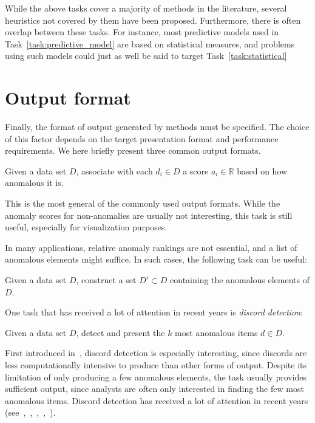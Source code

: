 While the above tasks cover a majority of methods in the literature, several heuristics not covered by them have been proposed. Furthermore, there is often overlap between these tasks. For instance, most predictive models used in Task~\ref{task:predictive_model} are based on statistical measures, and problems using such models could just as well be said to target Task~\ref{task:statistical}

\section{Output format}
\label{sect:output_format}

Finally, the format of output generated by methods must be specified. The choice of this factor depends on the target presentation format and performance requirements. We here briefly present three common output formats.

\begin{task}
\label{task:anomaly_scores}
  Given a data set $D$, associate with each $d_i \in D$ a score $a_i \in \mathbb{R}$ based on how anomalous it is.
\end{task}
This is the most general of the commonly used output formats. While the anomaly scores for non-anomalies are usually not interesting, this task is still useful, especially for visualization purposes.

In many applications, relative anomaly rankings are not essential, and a list of anomalous elements might suffice. In such cases, the following task can be useful:
\begin{task}
\label{task:anomalous_set}
  Given a data set $D$, construct a set $D' \subset D$ containing the anomalous elements of $D$.
\end{task}

One task that has received a lot of attention in recent years is \emph{discord detection}:
\begin{task}
\label{task:discord}
  Given a data set $D$, detect and present the $k$ most anomalous items $d \in D$.
\end{task}
First introduced in~\cite{keogh1}, discord detection is especially interesting, since discords are less computationally intensive to produce than other forms of output. Despite its limitation of only producing a few anomalous elements, the task usually provides sufficient output, since analysts are often only interested in finding the few most anomalous items. Discord detection has received a lot of attention in recent years (see~\cite{keogh1},~\cite{bu},~\cite{yankov},~\cite{fu},~\cite{lin}).

